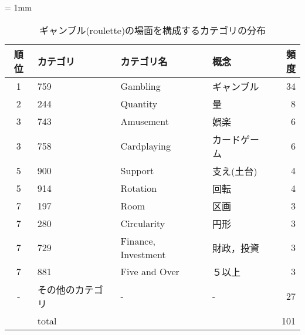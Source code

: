 \small
\begin{table}
  \caption{ギャンブル(roulette)の場面を構成するカテゴリの分布}
  \label{roulette_distri}
  \begin{center}
    \tabcolsep = 1mm
    \begin{tabular}{|c|l|l|l|r|} \hline
順位    & カテゴリ  & カテゴリ名 & 概念 & 頻度 \\ 
      \hline \hline
      1 & 759       & Gambling            & ギャンブル   & 34 \\
      2 & 244       & Quantity            & 量           & 8  \\
      3 & 743       & Amusement           & 娯楽         & 6  \\ 
      3 & 758       & Cardplaying         & カードゲーム & 6  \\
      5 & 900       & Support             & 支え(土台)   & 4  \\
      5 & 914       & Rotation            & 回転         & 4  \\
      7 & 197       & Room                & 区画         & 3  \\
      7 & 280       & Circularity         & 円形         & 3  \\
      7 & 729       & Finance, Investment & 財政，投資   & 3  \\
      7 & 881       & Five and Over       & ５以上       & 3  \\
      -  & その他のカテゴリ   & -                   & -            & 27 \\ \hline
         & total    &                     &              & 101 \\
      \hline
    \end{tabular}
  \end{center}
\end{table}
\normalsize


